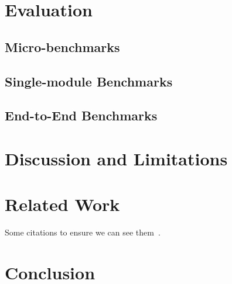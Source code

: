 \documentclass[letterpaper,twocolumn,10pt]{article}
\begin{document}
\section{Evaluation}
\label{eval}

\subsection{Micro-benchmarks}
\label{micro}

\subsection{Single-module Benchmarks}
\label{meso}

\subsection{End-to-End Benchmarks}
\label{macro}

\section{Discussion and Limitations}
\label{diss}

\section{Related Work}
\label{rw}
Some citations to ensure we can see them~\cite{Christophe:2015:DAU:2819009.2819180, Keil:2013:EDA:2508168.2508176, Lehmann:2019:WFD:3297858.3304068, Sun:2018:EDA:3178372.3179527}.

\section{Conclusion}
\label{end}

% 



\end{document}
